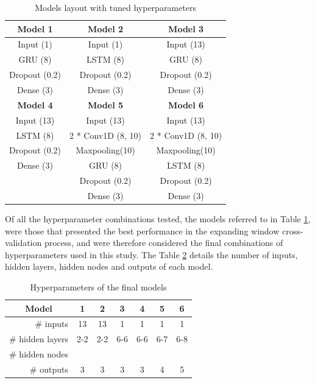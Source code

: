 \begin{table}[htbp]
  \centering
  \caption{Models layout with tuned hyperparameters}
    \begin{tabular}{ccc}
    \toprule
    \textbf{Model 1} & \textbf{Model 2} & \textbf{Model 3} \\
    \midrule
    Input (1) & Input (1) & Input (13) \\
    GRU (8) & LSTM (8) & GRU (8) \\
    Dropout (0.2) & Dropout (0.2) & Dropout (0.2) \\
    Dense (3) & Dense (3) & Dense (3) \\
    \midrule
    \textbf{Model 4} & \textbf{Model 5} & \textbf{Model 6} \\
    \midrule
    Input (13) & Input (13) & Input (13) \\
    LSTM (8) & 2 * Conv1D (8, 10) & 2 * Conv1D (8, 10) \\
    Dropout (0.2) & Maxpooling(10) & Maxpooling(10) \\
    Dense (3) & GRU (8) & LSTM (8) \\
      & Dropout (0.2) & Dropout (0.2) \\
      & Dense (3) & Dense (3) \\
    \end{tabular}%
  \label{tab:layouts}%
\end{table}%


Of all the hyperparameter combinations tested, the models referred to in Table \ref{tab:layouts}, were those that presented the best performance in the expanding window cross-validation process, and were therefore considered the final combinations of hyperparameters used in this study. The Table \ref{tab:characteristics} details the number of inputs, hidden layers, hidden nodes and outputs of each model. 


\begin{table}[htbp]
  \centering
  \caption{Hyperparameters of the final models}
    \begin{tabular}{r|cccccc}
    \toprule
    \multicolumn{1}{c|}{\textbf{Model}} & \textbf{1} & \textbf{2} & \textbf{3} & \textbf{4} & \textbf{5} & \textbf{6} \\
    \midrule
    \# inputs & 13 & 13 & 1 & 1 & 1 & 1 \\
    \# hidden layers & 2-2 & 2-2 & 6-6 & 6-6 & 6-7 & 6-8 \\
    \# hidden nodes &   &   &   &   &   &  \\
    \# outputs & 3 & 3 & 3 & 3 & 4 & 5 \\
    \end{tabular}%
  \label{tab:characteristics}%
\end{table}%


